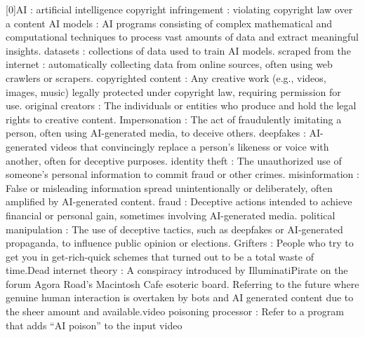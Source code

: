 [0]AI : artificial intelligence \newline
[1]copyright infringement : violating copyright law over a content \newline 
[2]AI models : AI programs consisting of complex mathematical and computational techniques to process vast amounts of data and extract meaningful insights. \newline
[3]datasets : collections of data used to train AI models. \newline
[4]scraped from the internet : automatically collecting data from online sources, often using web crawlers or scrapers. \newline
[5]copyrighted content : Any creative work (e.g., videos, images, music) legally protected under copyright law, requiring permission for use. \newline
[6]original creators : The individuals or entities who produce and hold the legal rights to creative content. \newline
[7]Impersonation : The act of fraudulently imitating a person, often using AI-generated media, to deceive others. \newline
[8]deepfakes : AI-generated videos that convincingly replace a person’s likeness or voice with another, often for deceptive purposes. \newline
[9]identity theft : The unauthorized use of someone’s personal information to commit fraud or other crimes. \newline
[10]misinformation : False or misleading information spread unintentionally or deliberately, often amplified by AI-generated content. \newline
[11]fraud : Deceptive actions intended to achieve financial or personal gain, sometimes involving AI-generated media. \newline
[12]political manipulation : The use of deceptive tactics, such as deepfakes or AI-generated propaganda, to influence public opinion or elections. \newline
[16]Grifters : People who try to get you in get-rich-quick schemes that turned out to be a total waste of time.\newline
[17]Dead internet theory : A conspiracy introduced by IlluminatiPirate on the forum Agora Road's Macintosh Cafe esoteric board. Referring to the future where genuine human interaction is overtaken by bots and AI generated content due to the sheer amount and available.\newline
[18]video poisoning processor : Refer to a program that adds “AI poison” to the input video\newline
